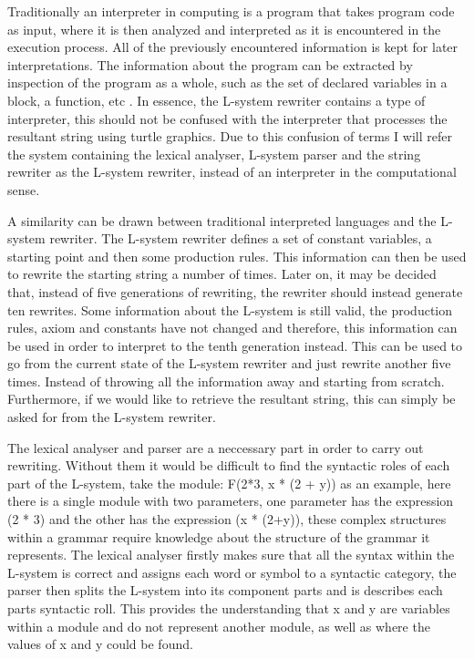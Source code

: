 \begin{flushleft}

Traditionally an interpreter in computing is a program that takes program code as input, where it is then analyzed and interpreted as it is encountered in the execution process. All of the previously encountered information is kept for later interpretations. The information about the program can be extracted by inspection of the program as a whole, such as the set of declared variables in a block, a function, etc \cite{wilhelm2010compiler}. In essence, the L-system rewriter contains a type of interpreter, this should not be confused with the interpreter that processes the resultant string using turtle graphics. Due to this confusion of terms I will refer the system containing the lexical analyser, L-system parser and the string rewriter as the L-system rewriter, instead of an interpreter in the computational sense. \\

\vspace{5mm}

A similarity can be drawn between traditional interpreted languages and the L-system rewriter. The L-system rewriter defines a set of constant variables, a starting point and then some production rules. This information can then be used to rewrite the starting string a number of times. Later on, it may be decided that, instead of five generations of rewriting, the rewriter should instead generate ten rewrites. Some information about the L-system is still valid, the production rules, axiom and constants have not changed and therefore, this information can be used in order to interpret to the tenth generation instead. This can be used to go from the current state of the L-system rewriter and just rewrite another five times. Instead of throwing all the information away and starting from scratch. Furthermore, if we would like to retrieve the resultant string, this can simply be asked for from the L-system rewriter. \\

\vspace{5mm}

The lexical analyser and parser are a neccessary part in order to carry out rewriting. Without them it would be difficult to find the syntactic roles of each part of the L-system, take the module: F(2*3, x * (2 + y)) as an example, here there is a single module with two parameters, one parameter has the expression (2 * 3) and the other has the expression (x * (2+y)), these complex structures within a grammar require knowledge about the structure of the grammar it represents. The lexical analyser firstly makes sure that all the syntax within the L-system is correct and assigns each word or symbol to a syntactic category, the parser then splits the L-system into its component parts and is describes each parts syntactic roll. This provides the understanding that x and y are variables within a module and do not represent another module, as well as where the values of x and y could be found. \\


\end{flushleft}
